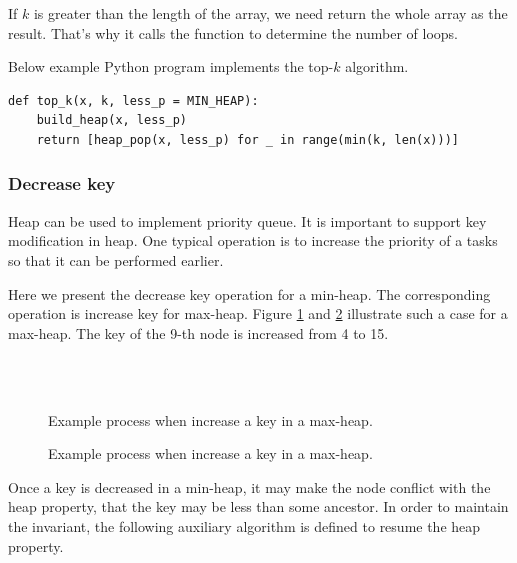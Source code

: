 \documentclass[b5paper]{article}
\begin{document}
If $k$ is greater than the length of the array,
we need return the whole array as the result. That's why it calls
the  function to determine the number of loops.

Below example Python program implements the top-$k$ algorithm.

\lstset{language=Python}
\begin{lstlisting}
def top_k(x, k, less_p = MIN_HEAP):
    build_heap(x, less_p)
    return [heap_pop(x, less_p) for _ in range(min(k, len(x)))]
\end{lstlisting}

\subsubsection{Decrease key}

Heap can be used to implement priority queue. It
is important to support key modification in heap. One typical operation
is to increase the priority of a tasks so that it can be performed
earlier.

Here we present the decrease key operation for a min-heap. The
corresponding operation is increase key for max-heap.
Figure \ref{fig:decrease-key-1} and \ref{fig:decrease-key-2} illustrate such a case for a max-heap.
The key of the 9-th node is increased from 4 to 15.

\begin{figure}[htbp]
    \centering
     \\
     \\
    \caption{Example process when increase a key in a max-heap.} \label{fig:decrease-key-1}
\end{figure}

\begin{figure}[htbp]
    \centering
    \caption{Example process when increase a key in a max-heap.} \label{fig:decrease-key-2}
\end{figure}

Once a key is decreased in a min-heap, it may make
the node conflict with the heap property, that the key may be less
than some ancestor. In order to maintain the
invariant, the following auxiliary algorithm is defined to resume the heap
property.
\end{document}

